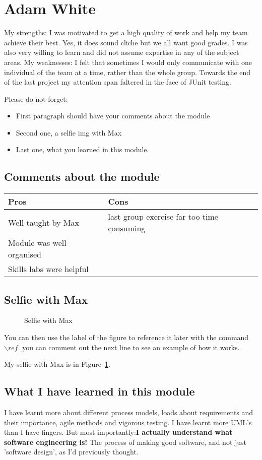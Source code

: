 \section{Adam White}
My strengths: I was motivated to get a high quality of work and help my team achieve their best. Yes, it does sound cliche but we all want good grades. I was 
also very willing to learn and did not assume expertise in any of the subject areas.
My weaknesses: I felt that sometimes I would only communicate with one individual of the team at a time, rather than the whole group. Towards the end of the last project my attention span faltered in the face of JUnit testing.

Please do not forget:
\begin{itemize}
	\item First paragraph should have your comments about the module
	\item Second one, a selfie img with Max
	\item Last one, what you learned in this module.
\end{itemize}

\subsection{Comments about the module}
\begin{table}
	\begin{tabular}{|l | l|}
	\hline
	Pros & Cons \\ \hline
	Well taught by Max & last group exercise far too time consuming \\ \hline
	Module was well organised & \\ \hline 
	Skills labs were helpful & \\ \hline
	\end{tabular}
\end{table}

\subsection{Selfie with Max}

\begin{figure}[h]
\caption{Selfie with Max}
\centering
\label{fig:selfie}
\end{figure}

You can then use the label of the figure to reference it later with the command ${\backslash}ref$. you can comment out the next line to see an example of how it works.

My selfie with Max is in  Figure~\ref{fig:selfie}.

\subsection{What I have learned in this module}
I have learnt more about different process models, loads about requirements and their importance, agile methods and vigorous testing. I have learnt more UML's than I have fingers. But most importantly:\textbf{I actually understand what software engineering is!} The process of making good software, and not just 'software design', as I'd previously thought. 
